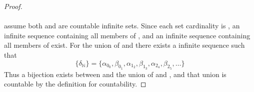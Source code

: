 \documentclass[preview]{standalone}
\begin{document}
\begin{proof}
    \\ \\
     assume both  and \bm{$\Lambda$} are countable infinite sets. 
    Since each set cardinality is , 
    an infinite sequence 
    containing all members of ,
    and an infinite sequence 
    containing all members of \bm{$\Lambda$}
    exist.
    For the union of  and \bm{$\Lambda$}
    there exists a infinite sequence \bm{$\big \{ \delta \big \} $} such that
    \begin{equation*}
        \big \{ \delta_\mathbb{N} \big \} 
            = 
        \big \{
            \alpha_{0_0}, \beta_{0_1}, 
            \alpha_{1_2}, \beta_{1_3}, 
            \alpha_{2_4}, \beta_{2_5}, 
            \dots
        \big \}    
    \end{equation*}
    Thus a bijection 
    exists between  and the union of  and \bm{$\Lambda$}, 
    and that union is countable by the definition for countability.
\end{proof}
\end{document}
